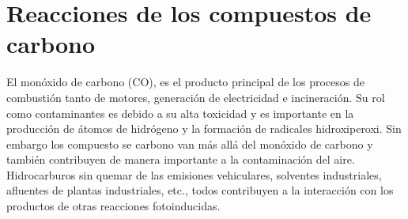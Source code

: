 \section{Reacciones de los compuestos de carbono}\label{recc}
El monóxido de carbono (CO), es el producto principal de los procesos de combustión tanto de motores, generación de electricidad e incineración. Su rol como contaminantes es debido a su alta toxicidad y es importante en la producción de átomos de hidrógeno y la formación de radicales hidroxiperoxi. Sin embargo los compuesto se carbono van más allá del monóxido de carbono y también contribuyen de manera importante a la contaminación del aire. Hidrocarburos sin quemar de las emisiones vehiculares, solventes industriales, afluentes de plantas industriales, etc., todos contribuyen a la interacción con los productos de otras reacciones fotoinducidas.

